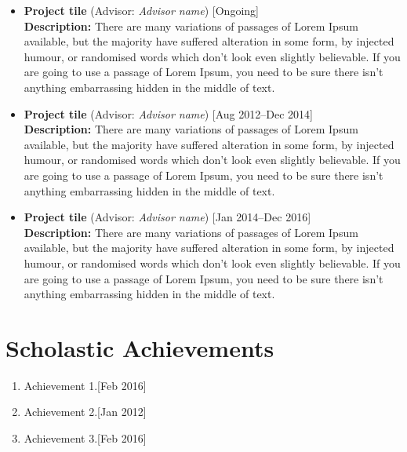 \documentclass[11pt,a4paper]{moderncv}
\begin{document}
\begin{itemize}	
	
	\item\textbf{Project tile} (Advisor: \textit{Advisor name}) \hfill [Ongoing]\\
	\textbf{Description:}
	There are many variations of passages of Lorem Ipsum available, but the majority have suffered alteration in some form, by injected humour, or randomised words which don't look even slightly believable. If you are going to use a passage of Lorem Ipsum, you need to be sure there isn't anything embarrassing hidden in the middle of text.
		
	\item\textbf{Project tile} (Advisor: \textit{Advisor name}) \hfill [Aug 2012--Dec 2014]\\
	\textbf{Description:}
	There are many variations of passages of Lorem Ipsum available, but the majority have suffered alteration in some form, by injected humour, or randomised words which don't look even slightly believable. If you are going to use a passage of Lorem Ipsum, you need to be sure there isn't anything embarrassing hidden in the middle of text.
   
	\item\textbf{Project tile} (Advisor: \textit{Advisor name}) \hfill [Jan 2014--Dec 2016]\\
	\textbf{Description:}
	There are many variations of passages of Lorem Ipsum available, but the majority have suffered alteration in some form, by injected humour, or randomised words which don't look even slightly believable. If you are going to use a passage of Lorem Ipsum, you need to be sure there isn't anything embarrassing hidden in the middle of text.
	
\end{itemize}

\section{Scholastic Achievements}

\begin{enumerate}  	
	
\item Achievement 1.\hfill [Feb 2016]

\item Achievement 2.\hfill [Jan 2012]

\item Achievement 3.\hfill [Feb 2016]		
\end{enumerate}
\end{document}
